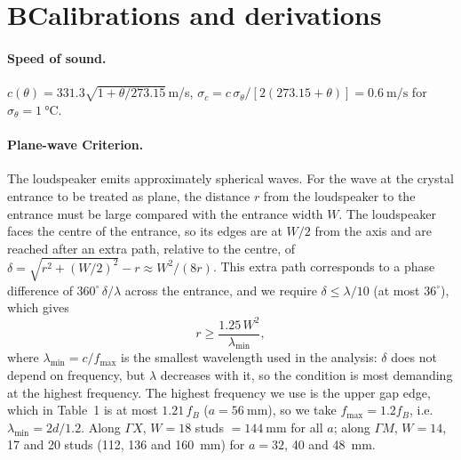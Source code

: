 \documentclass[9pt,a4paper,twocolumn]{extarticle}
\newcommand{\ums}{\metre\per\second}
\begin{document}
\clearpage
\section*{B\quad Calibrations and derivations}
\paragraph{Speed of sound.} $c(\theta)=331.3\sqrt{1+\theta/273.15}$\,m/s, $\sigma_c=c\,\sigma_\theta/[2(273.15+\theta)]=\SI{0.6}{\ums}$ for $\sigma_\theta=\SI{1}{\celsius}$.

\paragraph{Plane-wave Criterion.} The loudspeaker emits approximately spherical waves. For the wave at the crystal entrance to be treated as plane, the distance $r$ from the loudspeaker to the entrance must be large compared with the entrance width $W$. The loudspeaker faces the centre of the entrance, so its edges are at $W/2$ from the axis and are reached after an extra path, relative to the centre, of $\delta = \sqrt{r^2 + (W/2)^2} - r \approx W^2/(8r)$. This extra path corresponds to a phase difference of $360^\circ\,\delta/\lambda$ across the entrance, and we require $\delta \le \lambda/10$ (at most $36^\circ$), which gives
\begin{equation}
  r \ge \frac{1.25\,W^2}{\lambda_{\min}},
\end{equation}
where $\lambda_{\min} = c/f_{\max}$ is the smallest wavelength used in the analysis: $\delta$ does not depend on frequency, but $\lambda$ decreases with it, so the condition is most demanding at the highest frequency. The highest frequency we use is the upper gap edge, which in Table~1 is at most $1.21\,f_B$ ($a = \SI{56}{\milli\metre}$), so we take $f_{\max} = 1.2 f_B$, i.e.\ $\lambda_{\min} = 2d/1.2$. Along $\Gamma X$, $W = 18$ studs $= \SI{144}{\milli\metre}$ for all $a$; along $\Gamma M$, $W = 14$, 17 and 20 studs (112, 136 and \SI{160}{\milli\metre}) for $a = 32$, 40 and \SI{48}{\milli\metre}.
\end{document}
